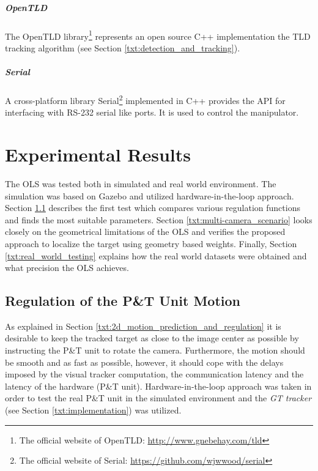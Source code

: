 	\paragraph{OpenTLD} The OpenTLD library\footnote{The official website of OpenTLD: \url{http://www.gnebehay.com/tld}} represents an open source C++ implementation the TLD tracking algorithm (see Section \ref{txt:detection_and_tracking}).	
	
	\paragraph{Serial} A cross-platform library Serial\footnote{The official website of Serial: \url{https://github.com/wjwwood/serial}} implemented in C++ provides the API for interfacing with RS-232 serial like ports. It is used to control the manipulator.
	
\chapter{Experimental Results}

The OLS was tested both in simulated and real world environment. The simulation was based on Gazebo and utilized hardware-in-the-loop approach. Section \ref{txt:test_regulation} describes the first test which compares various regulation functions and finds the most suitable parameters. Section \ref{txt:multi-camera_scenario} looks closely on the geometrical limitations of the OLS and verifies the proposed approach to localize the target using geometry based weights. Finally, Section \ref{txt:real_world_testing} explains how the real world datasets were obtained and what precision the OLS achieves.

\section{Regulation of the P\&T Unit Motion} \label{txt:test_regulation}

As explained in Section \ref{txt:2d_motion_prediction_and_regulation} it is desirable to keep the tracked target as close to the image center as possible by instructing the P\&T unit to rotate the camera. Furthermore, the motion should be smooth and as fast as possible, however, it should cope with the delays imposed by the visual tracker computation, the communication latency and the latency of the hardware (P\&T unit). Hardware-in-the-loop approach was taken in order to test the real P\&T unit in the simulated environment and the \textit{GT tracker} (see Section \ref{txt:implementation}) was utilized.

